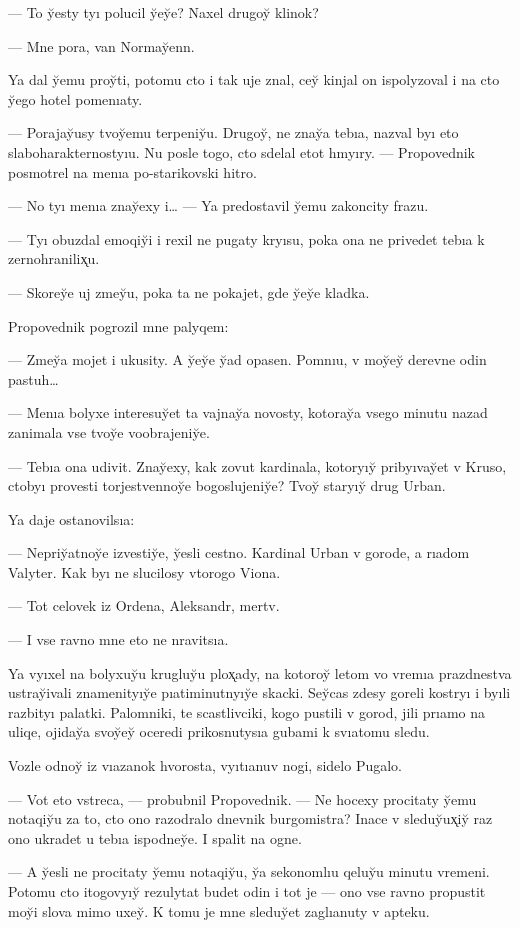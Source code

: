 \documentclass[10pt]{book}
\begin{document}
— To y̆esty tyı polucil y̆ey̆e? Naxel drugoy̆ klinok?

— Mne pora, van Normay̆enn.

Ya dal y̆emu proy̆ti, potomu cto i tak uje znal, cey̆ kinjal on ispolyzoval i na cto y̆ego hotel pomenıaty.



— Porajay̆usy tvoy̆emu terpeniy̆u. Drugoy̆, ne znay̆a tebıa, nazval byı eto slaboharakternostyıu. Nu posle togo, cto sdelal etot hmyıry. — Propovednik posmotrel na menıa po-starikovski hitro.

— No tyı menıa znay̆exy i… — Ya predostavil y̆emu zakoncity frazu.

— Tyı obuzdal emoqiy̆i i rexil ne pugaty kryısu, poka ona ne privedet tebıa k zernohranilix̨u.

— Skorey̆e uj zmey̆u, poka ta ne pokajet, gde y̆ey̆e kladka.

Propovednik pogrozil mne palyqem:

— Zmey̆a mojet i ukusity. A y̆ey̆e y̆ad opasen. Pomnıu, v moy̆ey̆ derevne odin pastuh…

— Menıa bolyxe interesuy̆et ta vajnay̆a novosty, kotoray̆a vsego minutu nazad zanimala vse tvoy̆e voobrajeniy̆e.

— Tebıa ona udivit. Znay̆exy, kak zovut kardinala, kotoryıy̆ pribyıvay̆et v Kruso, ctobyı provesti torjestvennoy̆e bogoslujeniy̆e? Tvoy̆ staryıy̆ drug Urban.

Ya daje ostanovilsıa:

— Nepriy̆atnoy̆e izvestiy̆e, y̆esli cestno. Kardinal Urban v gorode, a rıadom Valyter. Kak byı ne slucilosy vtorogo Viona.

— Tot celovek iz Ordena, Aleksandr, mertv.

— I vse ravno mne eto ne nravitsıa.

Ya vyıxel na bolyxuy̆u krugluy̆u plox̨ady, na kotoroy̆ letom vo vremıa prazdnestva ustray̆ivali znamenityıy̆e pıatiminutnyıy̆e skacki. Sey̆cas zdesy goreli kostryı i byıli razbityı palatki. Palomniki, te scastlivciki, kogo pustili v gorod, jili prıamo na uliqe, ojiday̆a svoy̆ey̆ oceredi prikosnutysıa gubami k svıatomu sledu.

Vozle odnoy̆ iz vıazanok hvorosta, vyıtıanuv nogi, sidelo Pugalo.

— Vot eto vstreca, — probubnil Propovednik. — Ne hocexy procitaty y̆emu notaqiy̆u za to, cto ono razodralo dnevnik burgomistra? Inace v sleduy̆ux̨iy̆ raz ono ukradet u tebıa ispodney̆e. I spalit na ogne.

— A y̆esli ne procitaty y̆emu notaqiy̆u, y̆a sekonomlıu qeluy̆u minutu vremeni. Potomu cto itogovyıy̆ rezulytat budet odin i tot je — ono vse ravno propustit moy̆i slova mimo uxey̆. K tomu je mne sleduy̆et zaglıanuty v apteku.
\end{document}

